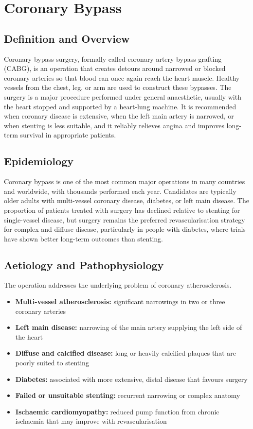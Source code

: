 \chapter{Coronary Bypass}

\section*{Definition and Overview}
Coronary bypass surgery, formally called coronary artery bypass grafting (CABG), is an operation that creates detours around narrowed or blocked coronary arteries so that blood can once again reach the heart muscle. Healthy vessels from the chest, leg, or arm are used to construct these bypasses. The surgery is a major procedure performed under general anaesthetic, usually with the heart stopped and supported by a heart-lung machine. It is recommended when coronary disease is extensive, when the left main artery is narrowed, or when stenting is less suitable, and it reliably relieves angina and improves long-term survival in appropriate patients.

\section*{Epidemiology}
Coronary bypass is one of the most common major operations in many countries and worldwide, with thousands performed each year. Candidates are typically older adults with multi-vessel coronary disease, diabetes, or left main disease. The proportion of patients treated with surgery has declined relative to stenting for single-vessel disease, but surgery remains the preferred revascularisation strategy for complex and diffuse disease, particularly in people with diabetes, where trials have shown better long-term outcomes than stenting.

\section*{Aetiology and Pathophysiology}
The operation addresses the underlying problem of coronary atherosclerosis.

\begin{itemize}
    \item \textbf{Multi-vessel atherosclerosis:} significant narrowings in two or three coronary arteries
    \item \textbf{Left main disease:} narrowing of the main artery supplying the left side of the heart
    \item \textbf{Diffuse and calcified disease:} long or heavily calcified plaques that are poorly suited to stenting
    \item \textbf{Diabetes:} associated with more extensive, distal disease that favours surgery
    \item \textbf{Failed or unsuitable stenting:} recurrent narrowing or complex anatomy
    \item \textbf{Ischaemic cardiomyopathy:} reduced pump function from chronic ischaemia that may improve with revascularisation
\end{itemize}

